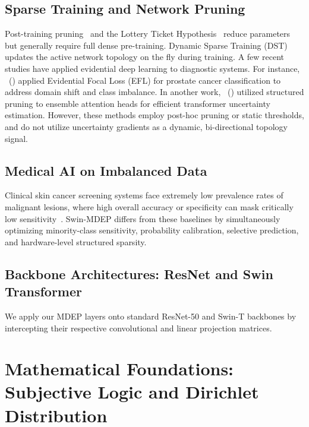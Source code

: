 \documentclass[letterpaper]{article} %
\begin{document}
\subsection{Sparse Training and Network Pruning}
Post-training pruning~\cite{han2016deep} and the Lottery Ticket Hypothesis~\cite{frankle2019lottery} reduce parameters but generally require full dense pre-training. Dynamic Sparse Training (DST)~\cite{mocanu2018scalable, evci2020rigging} updates the active network topology on the fly during training. A few recent studies have applied evidential deep learning to diagnostic systems. For instance, \citeauthor{zhou2023domain}~(\citeyear{zhou2023domain}) applied Evidential Focal Loss (EFL) for prostate cancer classification to address domain shift and class imbalance. In another work, \citeauthor{gabetni2026ensembling}~(\citeyear{gabetni2026ensembling}) utilized structured pruning to ensemble attention heads for efficient transformer uncertainty estimation. However, these methods employ post-hoc pruning or static thresholds, and do not utilize uncertainty gradients as a dynamic, bi-directional topology signal.

\subsection{Medical AI on Imbalanced Data}
Clinical skin cancer screening systems face extremely low prevalence rates of malignant lesions, where high overall accuracy or specificity can mask critically low sensitivity~\cite{esteva2017dermatologist, johnson2019survey}. Swin-MDEP differs from these baselines by simultaneously optimizing minority-class sensitivity, probability calibration, selective prediction, and hardware-level structured sparsity.

\subsection{Backbone Architectures: ResNet and Swin Transformer}
We apply our MDEP layers onto standard ResNet-50 and Swin-T backbones by intercepting their respective convolutional and linear projection matrices.

\section{Mathematical Foundations: Subjective Logic and Dirichlet Distribution}\label{sec:math}
\end{document}
